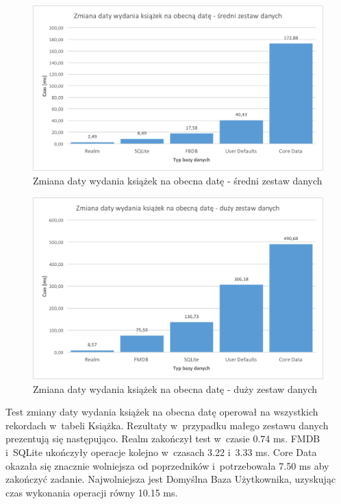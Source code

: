 \begin{figure}[H]
    \centering\includegraphics[width=\linewidth]{img/update_data/update_book/update_book_medium_test.png}
    \caption{Zmiana daty wydania książek na obecna datę - średni zestaw danych}
    \label{img: update-by-book-medium}
\end{figure}

\begin{figure}[H]
    \centering\includegraphics[width=\linewidth]{img/update_data/update_book/update_book_big_test.png}
    \caption{Zmiana daty wydania książek na obecna datę - duży zestaw danych}
    \label{img: update-by-book-big}
\end{figure}

Test zmiany daty wydania książek na obecna datę operował na wszystkich rekordach w~tabeli Książka. Rezultaty w~przypadku małego zestawu danych prezentują się następująco. Realm zakończył test w~czasie 0.74 ms. FMDB i~SQLite ukończyły operacje kolejno w~czasach 3.22 i~3.33 ms. Core Data okazała się znacznie wolniejsza od poprzedników i~potrzebowała 7.50 ms aby zakończyć zadanie. Najwolniejsza jest Domyślna Baza Użytkownika, uzyskując czas wykonania operacji równy 10.15 ms. 

